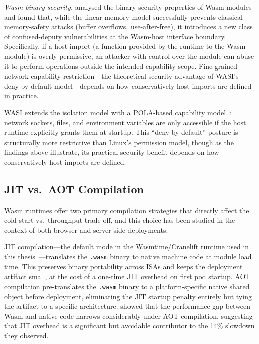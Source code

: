\textit{Wasm binary security.}\quad \textcite{lehmann2020everythingold} analysed the binary security properties of \acs{Wasm} modules and found that, while the linear memory model successfully prevents classical memory-safety attacks (buffer overflows, use-after-free), it introduces a new class of confused-deputy vulnerabilities at the Wasm-host interface boundary. Specifically, if a host import (a function provided by the runtime to the \acs{Wasm} module) is overly permissive, an attacker with control over the module can abuse it to perform operations outside the intended capability scope. Fine-grained network capability restriction---the theoretical security advantage of \acs{WASI}'s deny-by-default model---depends on how conservatively host imports are defined in practice.

\acs{WASI} extends the isolation model with a \ac{POLA}-based capability model~\cite{clark2019standardizing, bytecodealliance2024componentmodel}: network sockets, files, and environment variables are only accessible if the host runtime explicitly grants them at startup. This ``deny-by-default'' posture is structurally more restrictive than Linux's permission model, though as the findings above illustrate, its practical security benefit depends on how conservatively host imports are defined.

\subsection{JIT vs.\ AOT Compilation}
\label{sec:jit_vs_aot}

\acs{Wasm} runtimes offer two primary compilation strategies that directly affect the cold-start vs.\ throughput trade-off, and this choice has been studied in the context of both browser and server-side deployments.

\begin{sloppypar}
\ac{JIT} compilation---the default mode in the Wasmtime/Cranelift runtime used in this thesis~\cite{bytecodealliance2024wasmtime}---translates the \texttt{.wasm} binary to native machine code at module load time. This preserves binary portability across \acs{ISA}s and keeps the deployment artifact small, at the cost of a one-time JIT overhead on first pod startup. \ac{AOT} compilation pre-translates the \texttt{.wasm} binary to a platform-specific native shared object before deployment, eliminating the JIT startup penalty entirely but tying the artifact to a specific architecture. \textcite{spies2021evaluation} showed that the performance gap between \acs{Wasm} and native code narrows considerably under \acs{AOT} compilation, suggesting that JIT overhead is a significant but avoidable contributor to the 14\% slowdown they observed.
\end{sloppypar}

